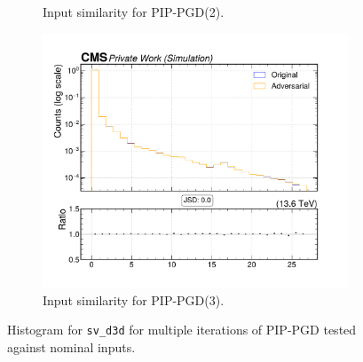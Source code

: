 \begin{figure}[htbp]
\begin{subfigure}[t]{0.32\textwidth}
    \caption*{Input similarity for PIP-PGD(2).}
  \end{subfigure}\hfill
  \begin{subfigure}[t]{0.32\textwidth}
    \includegraphics[width=\linewidth]{media/output/features/compare/combined_it_3/cmp_vtx_arr_sv_d3d.pdf}
    \caption*{Input similarity for PIP-PGD(3).}
  \end{subfigure}

  \caption*{Histogram for \texttt{sv\_d3d} for multiple iterations of PIP-PGD tested against nominal inputs.}
  \label{fig:combined_input_sv_d3d}
\end{figure}

